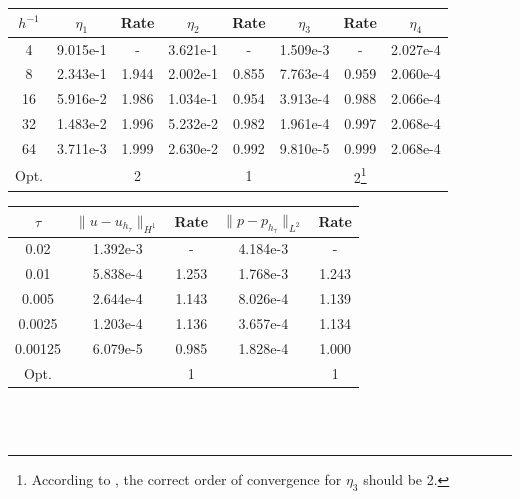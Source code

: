 \begin{center} 
\centering
\begin{tabular}{c|c|c|c|c|c|c|c}
$h^{-1}$ & $\eta_1$ & Rate &  $\eta_2$ & Rate & $\eta_3$ & Rate & $\eta_4$\\\hline
4  & 9.015e-1 & -     & 3.621e-1 & -     & 1.509e-3 & -     & 2.027e-4 \\
8  & 2.343e-1 & 1.944 & 2.002e-1 & 0.855 & 7.763e-4 & 0.959 & 2.060e-4 \\
16 & 5.916e-2 & 1.986 &1.034e-1  & 0.954 & 3.913e-4 & 0.988 & 2.066e-4 \\
32 & 1.483e-2 & 1.996 & 5.232e-2 & 0.982 & 1.961e-4 & 0.997 & 2.068e-4 \\
64 & 3.711e-3 & 1.999 & 2.630e-2 & 0.992 & 9.810e-5 & 0.999 & 2.068e-4 \\\hline
Opt. & & 2 & & 1 & & 2\footnote[1]{According to \cite{meunier}, the correct order of convergence for $\eta_3$ should be 2.} & 
\end{tabular}
 \label{tab:biot_default_space_est}

\clearpage
\begin{center}
\centering
\begin{tabular}{c|c|c|c|c}
$\tau$ & $\|u-u_{h_{\tau}}\|_{H^1}$ & Rate & $\|p-p_{h_{\tau}}\|_{L^2}$ & Rate \\\hline
0.02    & 1.392e-3 & -     & 4.184e-3 & -     \\
0.01    & 5.838e-4 & 1.253 & 1.768e-3 & 1.243 \\
0.005   & 2.644e-4 & 1.143 & 8.026e-4 & 1.139 \\
0.0025  & 1.203e-4 & 1.136 & 3.657e-4 & 1.134 \\
0.00125 & 6.079e-5 & 0.985 & 1.828e-4 & 1.000 \\ \hline
Opt. & & 1 & & 1 
\end{tabular}
 \label{tab:biot_default_time_error}
\end{center}
\end{center}
\mbox{}\\ \\
